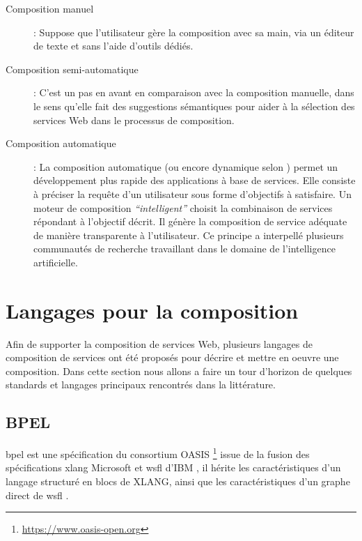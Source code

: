     \renewcommand{\descriptionlabel}[1]{\hspace{0.5cm}\textbullet~\textsf{#1}}
    \begin{description}
    \item[Composition manuel]: Suppose que l'utilisateur gère la
      composition avec sa main, via un éditeur de texte et sans l'aide
      d'outils dédiés.

    \item[Composition semi-automatique]: C'est un pas en avant en
      comparaison avec la composition manuelle, dans le sens qu'elle
      fait des suggestions sémantiques pour aider à la sélection des
      services Web dans le processus de composition.

    \item[Composition automatique]: La composition automatique (ou
      encore dynamique selon \cite{fluegge2006challenges}) permet un
      développement plus rapide des applications à base de
      services. Elle consiste à préciser la requête d'un utilisateur
      sous forme d'objectifs à satisfaire. Un moteur de composition
      \textit{``intelligent''} choisit la combinaison de services
      répondant à l'objectif décrit. Il génère la composition de
      service adéquate de manière transparente à l'utilisateur. Ce
      principe a interpellé plusieurs communautés de recherche
      travaillant dans le domaine de l'intelligence artificielle.
      \cite{elie2010}
    \end{description}
    \enddescription

\section{Langages pour la composition}
\label{sec:lang-de-comp}
Afin de supporter la composition de services Web, plusieurs langages
de composition de services ont été proposés pour décrire et mettre en
oeuvre une composition. Dans cette section nous allons a faire un tour
d'horizon de quelques standards et langages principaux rencontrés dans
la littérature.

  \subsection{BPEL}
  \label{sec:bpel}
  \acrshort{bpel} est une spécification du consortium OASIS
  \footnote{\url{https://www.oasis-open.org}} issue de la fusion des
  spécifications \acrshort{xlang} Microsoft et \acrshort{wsfl} d'IBM ,
  il hérite les caractéristiques d'un langage structuré en blocs de
  \textsc{XLANG}, ainsi que les caractéristiques d'un graphe direct de
  \acrshort{wsfl} \cite{driss2011approche}.\medskip


